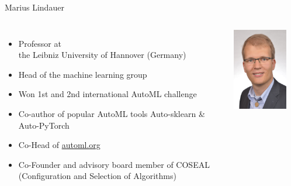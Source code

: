 \begin{frame}[c]{Marius Lindauer}

\begin{columns}


	\begin{itemize}
		\item Professor at\\ the Leibniz University of Hannover (Germany)
		\item Head of the machine learning group
		\item Won 1st and 2nd international AutoML challenge
		\item Co-author of popular AutoML tools Auto-sklearn \& Auto-PyTorch
		\item Co-Head of \url{automl.org}
		\item Co-Founder and advisory board member of COSEAL\\ (Configuration and Selection of Algorithms)
	\end{itemize}


	\includegraphics[width=0.8\textwidth]{images/lindauer.jpg}

\end{columns}

\end{frame}
